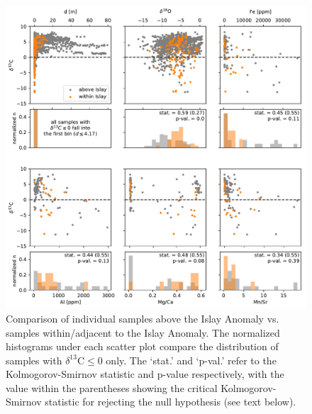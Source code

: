 \documentclass[11pt,letterpaper]{article}
\newcommand{\dC}{$\delta^{13}$C\xspace}
\newcommand{\permil}{\textperthousand\xspace}
\begin{document}
\begin{figure}[h!]
\begin{center}
	\includegraphics[width=\textwidth]{Figures/Siliciclastic_Filtering_Islay.pdf}
	\caption{Comparison of individual samples above the Islay Anomaly vs. samples within/adjacent to the Islay Anomaly. The normalized histograms under each scatter plot compare the distribution of samples with \dC$\leq$0\permil only. The `stat.' and `p-val.' refer to the Kolmogorov-Smirnov statistic and p-value respectively, with the value within the parentheses showing the critical Kolmogorov-Smirnov statistic for rejecting the null hypothesis (see text below).}
	\label{fig:Siliciclastic_Filtering_Islay}
\end{center}
\end{figure}

\clearpage
\end{document}

